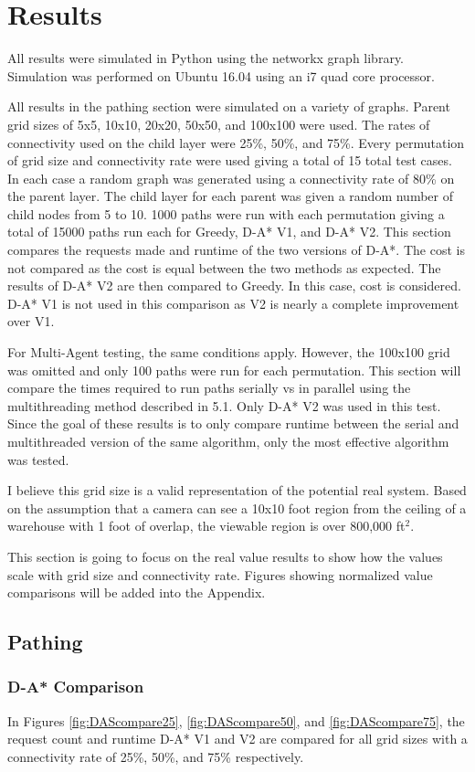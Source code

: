 \section{Results}
All results were simulated in Python using the networkx graph library. Simulation was performed on Ubuntu 16.04 using an i7 quad core processor.

All results in the pathing section were simulated on a variety of graphs. Parent grid sizes of 5x5, 10x10, 20x20, 50x50, and 100x100 were used. The rates of connectivity used on the child layer were 25\%, 50\%, and 75\%. Every permutation of grid size and connectivity rate were used giving a total of 15 total test cases. In each case a random graph was generated using a connectivity rate of 80\% on the parent layer. The child layer for each parent was given a random number of child nodes from 5 to 10. 1000 paths were run with each permutation giving a total of 15000 paths run each for Greedy, D-A* V1, and D-A* V2. This section compares the requests made and runtime of the two versions of D-A*. The cost is not compared as the cost is equal between the two methods as expected. The results of D-A* V2 are then compared to Greedy. In this case, cost is considered. D-A* V1 is not used in this comparison as V2 is nearly a complete improvement over V1.

For Multi-Agent testing, the same conditions apply. However, the 100x100 grid was omitted and only 100 paths were run for each permutation. This section will compare the times required to run paths serially vs in parallel using the multithreading method described in 5.1. Only D-A* V2 was used in this test. Since the goal of these results is to only compare runtime between the serial and multithreaded version of the same algorithm, only the most effective algorithm was tested.


I believe this grid size is a valid representation of the potential real system. Based on the assumption that a camera can see a 10x10 foot region from the ceiling of a warehouse with 1 foot of overlap, the viewable region is over 800,000 ft$^2$.

This section is going to focus on the real value results to show how the values scale with grid size and connectivity rate. Figures showing normalized value comparisons will be added into the Appendix.

\subsection{Pathing}
	\subsubsection{D-A* Comparison}
	In Figures \ref{fig:DAScompare25}, \ref{fig:DAScompare50}, and \ref{fig:DAScompare75}, the request count and runtime D-A* V1 and V2 are compared for all grid sizes with a connectivity rate of 25\%, 50\%, and 75\% respectively.
	

